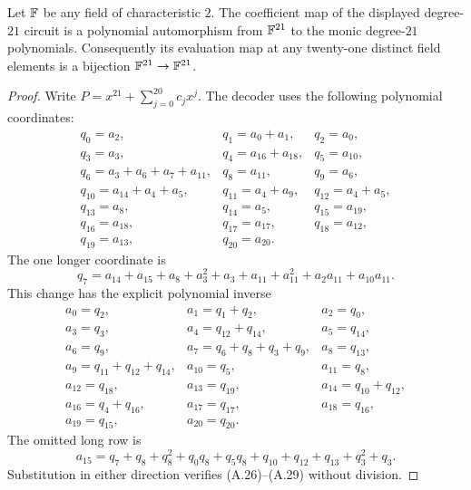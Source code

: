 \begin{lemma}
\label{lem:char2-degree21-inverse}
Let $\mathbb{F}$ be any field of characteristic $2$.  The coefficient map of the
displayed degree-$21$ circuit is a polynomial automorphism from $\mathbb{F}^{21}$ to
the monic degree-$21$ polynomials.  Consequently its evaluation map at any
twenty-one distinct field elements is a bijection $\mathbb{F}^{21}\to\mathbb{F}^{21}$.
\end{lemma}
\begin{proof}
Write $P=x^{21}+\sum_{j=0}^{20}c_jx^j$.  The decoder uses the following
polynomial coordinates:
\[
\begin{array}{lll}
q_0=a_2,&q_1=a_0+a_1,&q_2=a_0,\\
q_3=a_3,&q_4=a_{16}+a_{18},&q_5=a_{10},\\
q_6=a_3+a_6+a_7+a_{11},&q_8=a_{11},&q_9=a_6,\\
q_{10}=a_{14}+a_4+a_5,&q_{11}=a_4+a_9,&q_{12}=a_4+a_5,\\
q_{13}=a_8,&q_{14}=a_5,&q_{15}=a_{19},\\
q_{16}=a_{18},&q_{17}=a_{17},&q_{18}=a_{12},\\
q_{19}=a_{13},&q_{20}=a_{20}.&
\end{array}                                                       \tag{A.26}\label{eq:char2-21-q-forward}
\]
The one longer coordinate is
\[
 q_7=a_{14}+a_{15}+a_8+a_3^2+a_3+a_{11}+a_{11}^2
       +a_2a_{11}+a_{10}a_{11}.                                 \tag{A.27}
\]
This change has the explicit polynomial inverse
\[
\begin{array}{lll}
a_0=q_2,&a_1=q_1+q_2,&a_2=q_0,\\
a_3=q_3,&a_4=q_{12}+q_{14},&a_5=q_{14},\\
a_6=q_9,&a_7=q_6+q_8+q_3+q_9,&a_8=q_{13},\\
a_9=q_{11}+q_{12}+q_{14},&a_{10}=q_5,&a_{11}=q_8,\\
a_{12}=q_{18},&a_{13}=q_{19},&a_{14}=q_{10}+q_{12},\\
a_{16}=q_4+q_{16},&a_{17}=q_{17},&a_{18}=q_{16},\\
a_{19}=q_{15},&a_{20}=q_{20}.&
\end{array}                                                       \tag{A.28}
\]
The omitted long row is
\[
 a_{15}=q_7+q_8+q_8^2+q_0q_8+q_5q_8+q_{10}+q_{12}+q_{13}
          +q_3^2+q_3.                                           \tag{A.29}
\]
Substitution in either direction verifies (A.26)--(A.29) without division.


\end{proof}
